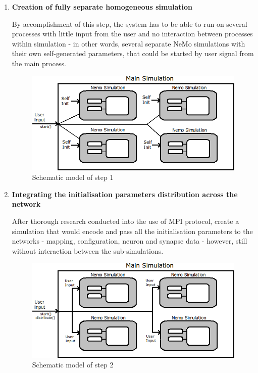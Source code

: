 \begin{enumerate}

\item{\textbf{Creation of fully separate homogeneous simulation}}

By accomplishment of this step, the system has to be able to run on several processes with little input from the user and no interaction between processes within simulation - in other words, several separate NeMo simulations with their own self-generated parameters, that could be started by user signal from the main process.

\begin{figure}[h!]
\begin{center}
\includegraphics[scale = 0.7]{images/design/design_stage_1.png}
\end{center}
\caption{Schematic model of step 1}
\end{figure}

\item{\textbf{Integrating the initialisation parameters distribution across the network}}

After thorough research conducted into the use of MPI protocol, create a simulation that would encode and pass all the initialisation parameters to the networks - mapping, configuration, neuron and synapse data - however, still without interaction between the sub-simulations.

\begin{figure}[h!]
\begin{center}
\includegraphics[scale = 0.7]{images/design/design_stage_2.png}
\end{center}
\caption{Schematic model of step 2}
\end{figure}


\end{enumerate}
